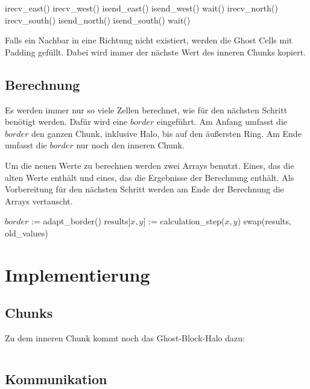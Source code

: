 \documentclass[12pt]{article}
\begin{document}
\begin{algorithmic}[1]
    \State irecv\_east()
    \State irecv\_west()
    \State isend\_east()
    \State isend\_west()
    \State wait()
    \State irecv\_north()
    \State irecv\_south()
    \State isend\_north()
    \State isend\_south()
    \State wait()
\end{algorithmic}

Falls ein Nachbar in eine Richtung nicht existiert, werden die Ghost Cells mit Padding gefüllt. Dabei wird immer der nächste Wert des inneren Chunks kopiert.

\subsection{Berechnung}
Es werden immer nur so viele Zellen berechnet, wie für den nächsten Schritt benötigt werden. Dafür wird eine $border$ eingeführt.
Am Anfang umfasst die $border$ den ganzen Chunk, inklusive Halo, bis auf den äußersten Ring. Am Ende umfasst die $border$ nur noch den inneren Chunk.

Um die neuen Werte zu berechnen werden zwei Arrays benutzt. Eines, das die alten Werte enthält und eines, das die Ergebnisse der Berechnung enthält. Als Vorbereitung für den nächsten Schritt werden am Ende der Berechnung die Arrays vertauscht.

\begin{algorithmic}[1]
    \State $border$ := adapt\_border()
        \State results[$x,y$] := calculation\_step($x,y$) 
    \EndFor
    \State swap(results, old\_values)
\end{algorithmic}


\clearpage
\section{Implementierung}
\subsection{Chunks}
Zu dem inneren Chunk kommt noch das Ghost-Block-Halo dazu:
\inputminted[fontsize=\scriptsize, firstline=73, lastline=78]{C}{../src/waermeleitung.cpp}

\subsection{Kommunikation}
\end{document}
